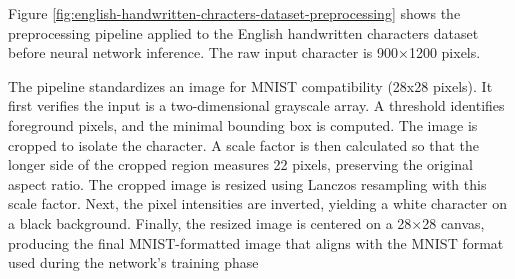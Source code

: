 

Figure \ref{fig:english-handwritten-chracters-dataset-preprocessing} shows the preprocessing pipeline applied to the English handwritten characters dataset before neural network inference. The raw input character is 900×1200 pixels.

The pipeline standardizes an image for MNIST compatibility (28x28 pixels). It first verifies the input is a two-dimensional grayscale array. A threshold identifies foreground pixels, and the minimal bounding box is computed. The image is cropped to isolate the character. A scale factor is then calculated so that the longer side of the cropped region measures 22 pixels, preserving the original aspect ratio. The cropped image is resized using Lanczos resampling with this scale factor. Next, the pixel intensities are inverted, yielding a white character on a black background. Finally, the resized image is centered on a 28×28 canvas, producing the final MNIST-formatted image that aligns with the MNIST format used during the network's training phase


